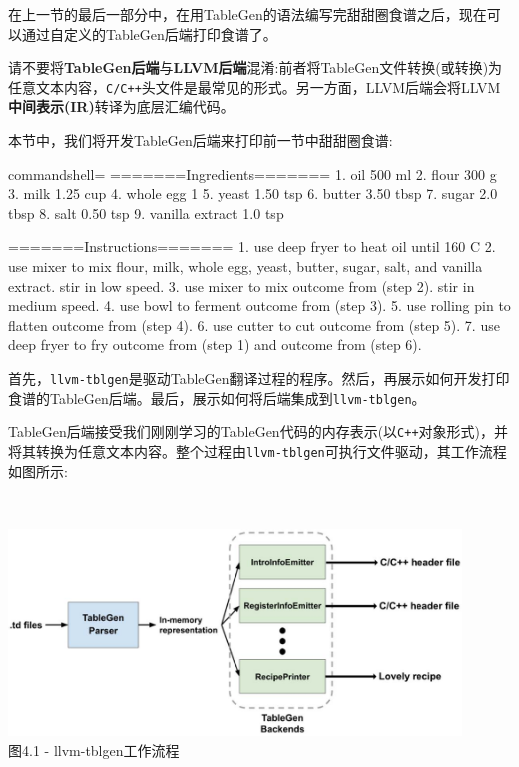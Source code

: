 在上一节的最后一部分中，在用TableGen的语法编写完甜甜圈食谱之后，现在可以通过自定义的TableGen后端打印食谱了。

\begin{tcolorbox}[colback=blue!5!white,colframe=blue!75!black, fonttitle=\bfseries,title=Note]
\hspace*{0.7cm}请不要将\textbf{TableGen后端}与\textbf{LLVM后端}混淆:前者将TableGen文件转换(或转换)为任意文本内容，\texttt{C/C++}头文件是最常见的形式。另一方面，LLVM后端会将LLVM\textbf{中间表示(IR)}转译为底层汇编代码。
\end{tcolorbox}

本节中，我们将开发TableGen后端来打印前一节中甜甜圈食谱:

\begin{tcblisting}{commandshell={}}
=======Ingredients=======
1. oil 500 ml
2. flour 300 g
3. milk 1.25 cup
4. whole egg 1
5. yeast 1.50 tsp
6. butter 3.50 tbsp
7. sugar 2.0 tbsp
8. salt 0.50 tsp
9. vanilla extract 1.0 tsp

=======Instructions=======
1. use deep fryer to heat oil until 160 C
2. use mixer to mix flour, milk, whole egg, yeast, butter,
sugar, salt, and vanilla extract. stir in low speed.
3. use mixer to mix outcome from (step 2). stir in medium
speed.
4. use bowl to ferment outcome from (step 3).
5. use rolling pin to flatten outcome from (step 4).
6. use cutter to cut outcome from (step 5).
7. use deep fryer to fry outcome from (step 1) and outcome from
(step 6).
\end{tcblisting}

首先，\texttt{llvm-tblgen}是驱动TableGen翻译过程的程序。然后，再展示如何开发打印食谱的TableGen后端。最后，展示如何将后端集成到\texttt{llvm-tblgen}。


TableGen后端接受我们刚刚学习的TableGen代码的内存表示(以\texttt{C++}对象形式)，并将其转换为任意文本内容。整个过程由\texttt{llvm-tblgen}可执行文件驱动，其工作流程如图所示:

\hspace*{\fill} \\ %
\begin{center}
\includegraphics[width=0.9\textwidth]{content/1/chapter4/images/1.jpg}\\
图4.1 - llvm-tblgen工作流程
\end{center}

